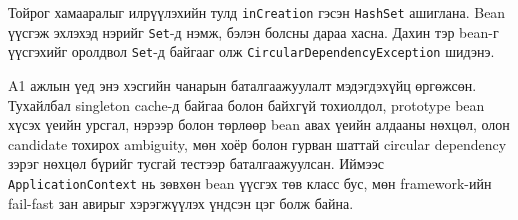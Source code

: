 Тойрог хамааралыг илрүүлэхийн тулд \texttt{inCreation} гэсэн
\texttt{HashSet} ашиглана. Bean үүсгэж эхлэхэд нэрийг
\texttt{Set}-д нэмж, бэлэн болсны дараа хасна. Дахин тэр bean-г
үүсгэхийг оролдвол \texttt{Set}-д байгааг олж
\texttt{CircularDependencyException} шидэнэ.

A1 ажлын үед энэ хэсгийн чанарын баталгаажуулалт мэдэгдэхүйц
өргөжсөн. Тухайлбал singleton cache-д байгаа болон байхгүй
тохиолдол, prototype bean хүсэх үеийн урсгал, нэрээр болон төрлөөр
bean авах үеийн алдааны нөхцөл, олон candidate тохирох ambiguity,
мөн хоёр болон гурван шаттай circular dependency зэрэг нөхцөл бүрийг
тусгай тестээр баталгаажуулсан. Иймээс \texttt{ApplicationContext}
нь зөвхөн bean үүсгэх төв класс бус, мөн framework-ийн fail-fast
зан авирыг хэрэгжүүлэх үндсэн цэг болж байна.

